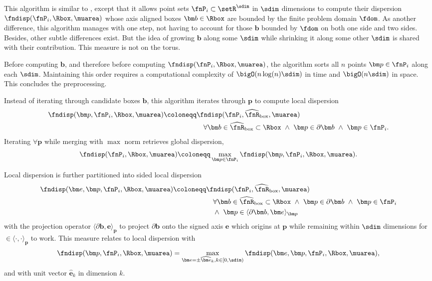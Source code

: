 %
\label{sec:disp-gs}
This algorithm is similar to , except that it allows point sets $\fnP_i \subset \setR^{\sdim}$ in $\sdim$ dimensions to compute their dispersion $\fndisp(\fnP_i, \Rbox, \muarea)$ whose axis aligned boxes $\bm b \in \Rbox$ are bounded by the finite problem domain $\fdom$. As another difference, this algorithm manages with one step, not having to account for those $\bm b$ bounded by $\fdom$ on both one side and two sides. Besides, other subtle differences exist. But the idea of growing $\bm b$ along some $\sdim$ while shrinking it along some other $\sdim$ is shared with their contribution. This measure is not on the torus.

Before computing $\bm b$, and therefore before computing $\fndisp(\fnP_i, \Rbox, \muarea)$, the algorithm sorts all $n$ points $\bm p \in \fnP_i$ along each $\sdim$. Maintaining this order requires a computational complexity of $\bigO(n\log(n)\sdim)$ in time and $\bigO(n \sdim)$ in space. This concludes the preprocessing.

Instead of iterating through candidate boxes $\bm b$, this algorithm iterates through $\bm p$ to compute local dispersion
\begin{align*}
  \fndisp(\bm p, \fnP_i, \Rbox, \muarea) \coloneqq &\fndisp(\fnP_i, \widehat\fnR_{\text{box}}, \muarea) \\
  &\quad \forall \bm b \in \widehat\fnR_{\text{box}} \subset \Rbox\ \wedge\ \bm p \in \partial\bm b\ \wedge\ \bm p \in \fnP_i.
\end{align*}
Iterating $\forall \bm p$ while merging with $\max$ norm retrieves global dispersion,
\begin{align*}
  \fndisp(\fnP_i, \Rbox, \muarea) \coloneqq \max_{\bm p \in \fnP_i} \fndisp(\bm p, \fnP_i, \Rbox, \muarea).
\end{align*}

Local dispersion is further partitioned into sided local dispersion
\begin{align*}
  \fndisp(\bm e, \bm p, \fnP_i, \Rbox, \muarea) \coloneqq &\fndisp(\fnP_i, \widehat\fnR_{\text{box}}, \muarea) \\
  &\quad \forall \bm b \in \widehat\fnR_{\text{box}} \subset \Rbox\ \wedge\ \bm p \in \partial\bm b\ \wedge\ \bm p \in \fnP_i \\
  &\quad \wedge\ \bm p \in \langle \partial \bm b, \bm e \rangle_{\bm p}
\end{align*}
with the projection operator $\langle \partial \bm b, \bm e \rangle_{\bm p}$ to  project $\partial\bm b$ onto the signed axis $\bm e$ which origins at $\bm p$ while remaining within $\sdim$ dimensions for $\in \langle \cdot,\cdot\rangle_{\bm p}$ to work. This measure relates to local dispersion with
\begin{align*}
  \fndisp(\bm p, \fnP_i, \Rbox, \muarea) = \max_{\bm e = \pm \widehat{\bm e}_k, k \in [0,\sdim)} \fndisp(\bm e, {\bm p}, \fnP_i, \Rbox, \muarea),
\end{align*}
and with unit vector $\widehat{\bm e}_k$ in dimension $k$.

